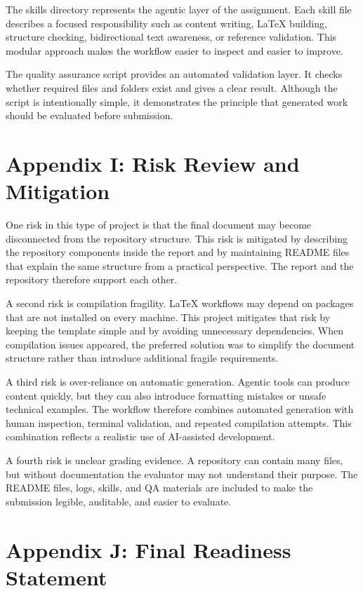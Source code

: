 \documentclass{custom-academic-template}
\begin{document}
The skills directory represents the agentic layer of the assignment. Each skill file describes a focused responsibility such as content writing, LaTeX building, structure checking, bidirectional text awareness, or reference validation. This modular approach makes the workflow easier to inspect and easier to improve.

The quality assurance script provides an automated validation layer. It checks whether required files and folders exist and gives a clear result. Although the script is intentionally simple, it demonstrates the principle that generated work should be evaluated before submission.

\newpage
\section{Appendix I: Risk Review and Mitigation}

One risk in this type of project is that the final document may become disconnected from the repository structure. This risk is mitigated by describing the repository components inside the report and by maintaining README files that explain the same structure from a practical perspective. The report and the repository therefore support each other.

A second risk is compilation fragility. LaTeX workflows may depend on packages that are not installed on every machine. This project mitigates that risk by keeping the template simple and by avoiding unnecessary dependencies. When compilation issues appeared, the preferred solution was to simplify the document structure rather than introduce additional fragile requirements.

A third risk is over-reliance on automatic generation. Agentic tools can produce content quickly, but they can also introduce formatting mistakes or unsafe technical examples. The workflow therefore combines automated generation with human inspection, terminal validation, and repeated compilation attempts. This combination reflects a realistic use of AI-assisted development.

A fourth risk is unclear grading evidence. A repository can contain many files, but without documentation the evaluator may not understand their purpose. The README files, logs, skills, and QA materials are included to make the submission legible, auditable, and easier to evaluate.

\newpage
\section{Appendix J: Final Readiness Statement}
\end{document}

